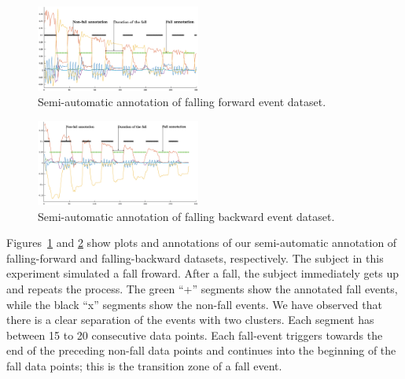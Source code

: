\documentclass[]{IEEEtran}
\begin{document}
\begin{figure}[!htb]
\centering
\includegraphics[width=0.48\textwidth]{plots/human_falling_forward2.eps} 
\caption{Semi-automatic annotation of falling forward event dataset.}
 \label{fig:automatic_annotation} 
\end{figure}


\begin{figure}[!htb]
\centering
\includegraphics[width=0.48\textwidth]{plots/human_falling_backward2.eps} 
\caption{Semi-automatic annotation of falling backward event dataset.}
 \label{fig:automatic_annotation2} 
\end{figure}







Figures~\ref{fig:automatic_annotation} and \ref{fig:automatic_annotation2} show plots and annotations of our semi-automatic annotation of falling-forward  and falling-backward datasets, respectively. The subject in this experiment simulated a fall froward. After a 
fall, the subject immediately gets up and repeats the process. The green ``+'' segments 
show the annotated fall events, while the black ``x'' segments show the non-fall 
events. We have observed that there is a clear separation of the events with two 
clusters. Each segment has between 15 to 20 consecutive data points.
Each fall-event triggers 
towards the end of the preceding non-fall data points and continues into the beginning of the fall data points; this is the transition zone of a fall event.
\end{document}
